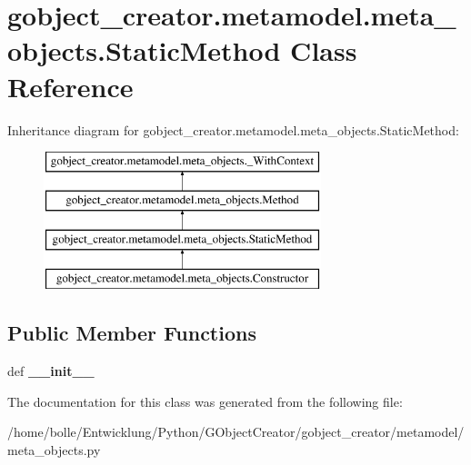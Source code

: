\hypertarget{classgobject__creator_1_1metamodel_1_1meta__objects_1_1StaticMethod}{
\section{gobject\_\-creator.metamodel.meta\_\-objects.StaticMethod Class Reference}
\label{classgobject__creator_1_1metamodel_1_1meta__objects_1_1StaticMethod}
}
Inheritance diagram for gobject\_\-creator.metamodel.meta\_\-objects.StaticMethod:\begin{figure}[H]
\begin{center}
\leavevmode
\includegraphics[height=4cm]{classgobject__creator_1_1metamodel_1_1meta__objects_1_1StaticMethod}
\end{center}
\end{figure}
\subsection*{Public Member Functions}
\begin{DoxyCompactItemize}
\item 
\hypertarget{classgobject__creator_1_1metamodel_1_1meta__objects_1_1StaticMethod_a576f992a818f8744f26d37cfb1adc963}{
def {\bfseries \_\-\_\-init\_\-\_\-}}
\label{classgobject__creator_1_1metamodel_1_1meta__objects_1_1StaticMethod_a576f992a818f8744f26d37cfb1adc963}

\end{DoxyCompactItemize}


The documentation for this class was generated from the following file:\begin{DoxyCompactItemize}
\item 
/home/bolle/Entwicklung/Python/GObjectCreator/gobject\_\-creator/metamodel/meta\_\-objects.py\end{DoxyCompactItemize}
